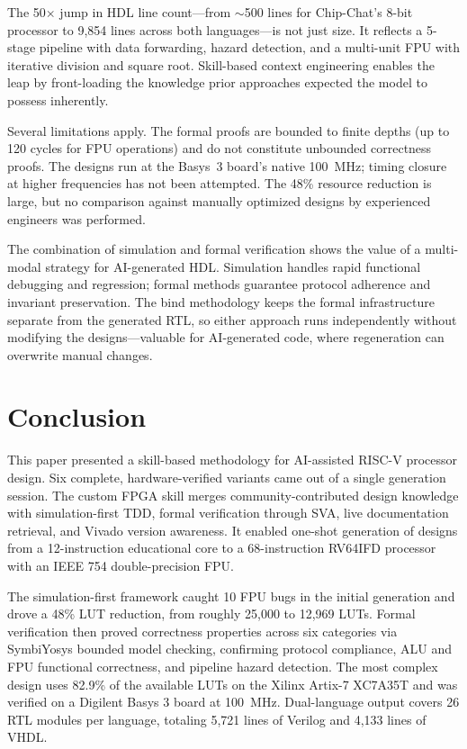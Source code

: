 \documentclass[journal]{IEEEtran}
\begin{document}
The 50$\times$ jump in HDL line count---from $\sim$500 lines for Chip-Chat's 8-bit processor to 9,854 lines across both languages---is not just size. It reflects a 5-stage pipeline with data forwarding, hazard detection, and a multi-unit FPU with iterative division and square root. Skill-based context engineering enables the leap by front-loading the knowledge prior approaches expected the model to possess inherently.

Several limitations apply. The formal proofs are bounded to finite depths (up to 120 cycles for FPU operations) and do not constitute unbounded correctness proofs. The designs run at the Basys~3 board's native 100~MHz; timing closure at higher frequencies has not been attempted. The 48\% resource reduction is large, but no comparison against manually optimized designs by experienced engineers was performed.

The combination of simulation and formal verification shows the value of a multi-modal strategy for AI-generated HDL. Simulation handles rapid functional debugging and regression; formal methods guarantee protocol adherence and invariant preservation. The bind methodology keeps the formal infrastructure separate from the generated RTL, so either approach runs independently without modifying the designs---valuable for AI-generated code, where regeneration can overwrite manual changes.

\section{Conclusion}

This paper presented a skill-based methodology for AI-assisted RISC-V processor design. Six complete, hardware-verified variants came out of a single generation session. The custom FPGA skill merges community-contributed design knowledge with simulation-first TDD, formal verification through SVA, live documentation retrieval, and Vivado version awareness. It enabled one-shot generation of designs from a 12-instruction educational core to a 68-instruction RV64IFD processor with an IEEE 754 double-precision FPU.

The simulation-first framework caught 10 FPU bugs in the initial generation and drove a 48\% LUT reduction, from roughly 25,000 to 12,969 LUTs. Formal verification then proved correctness properties across six categories via SymbiYosys bounded model checking, confirming protocol compliance, ALU and FPU functional correctness, and pipeline hazard detection. The most complex design uses 82.9\% of the available LUTs on the Xilinx Artix-7 XC7A35T and was verified on a Digilent Basys 3 board at 100~MHz. Dual-language output covers 26 RTL modules per language, totaling 5,721 lines of Verilog and 4,133 lines of VHDL.
\end{document}
